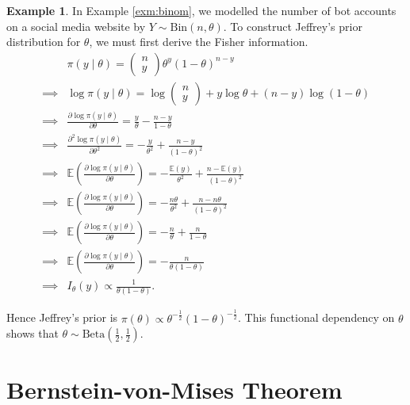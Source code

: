 \documentclass[
]{book}
\theoremstyle{definition}
\theoremstyle{definition}
\newtheorem{example}{Example}[chapter]
\theoremstyle{definition}
\theoremstyle{definition}
\theoremstyle{remark}
\begin{document}
\begin{example}
In Example \ref{exm:binom}, we modelled the number of bot accounts on a social media website by \(Y \sim \textrm{Bin}(n, \theta)\). To construct Jeffrey's prior distribution for \(\theta\), we must first derive the Fisher information.\\
\begin{align*}
&\pi(y \mid \theta) = \begin{pmatrix} n \\ y \end{pmatrix} \theta^y (1-\theta)^{n-y}\\ 
\implies &\log \pi(y \mid \theta) = \log \begin{pmatrix} n \\ y \end{pmatrix} + y \log\theta + (n-y)\log(1-\theta) \\
\implies &\frac{\partial \log \pi(y \mid \theta)}{\partial \theta} = \frac{y}{\theta} - \frac{n-y}{1-\theta} \\
\implies &\frac{\partial^2 \log \pi(y \mid \theta)}{\partial \theta^2} = -\frac{y}{\theta^2} + \frac{n-y}{(1-\theta)^2} \\
\implies &\mathbb{E}\left(\frac{\partial \log \pi(y \mid \theta)}{\partial \theta}\right) = -\frac{\mathbb{E}(y)}{\theta^2} + \frac{n-\mathbb{E}(y)}{(1-\theta)^2}\\ 
\implies &\mathbb{E}\left(\frac{\partial \log \pi(y \mid \theta)}{\partial \theta}\right) = -\frac{n\theta}{\theta^2} + \frac{n-n\theta}{(1-\theta)^2}\\ 
\implies &\mathbb{E}\left(\frac{\partial \log \pi(y \mid \theta)}{\partial \theta}\right) = -\frac{n}{\theta} + \frac{n}{1-\theta}\\
\implies &\mathbb{E}\left(\frac{\partial \log \pi(y \mid \theta)}{\partial \theta}\right) = -\frac{n}{\theta(1-\theta)} \\
\implies &I_\theta(y) \propto \frac{1}{\theta(1-\theta)}.
\end{align*}

Hence Jeffrey's prior is \(\pi(\theta) \propto \theta^{-\frac{1}{2}}(1-\theta)^{-\frac{1}{2}}\). This functional dependency on \(\theta\) shows that \(\theta \sim \textrm{Beta}(\frac{1}{2}, \frac{1}{2})\).
\end{example}

\section{Bernstein-von-Mises Theorem}\label{bernstein-von-mises-theorem}
\end{document}
